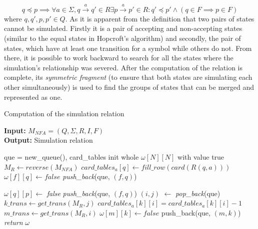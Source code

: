 \begin{equation*}
    q \preceq p \implies \forall a \in \Sigma , q\xrightarrow{\text{$a$}}q' \in R \exists p\xrightarrow{\text{$a$}}p' \in R: q' \preceq p' \land (q \in F \implies p \in F) 
\end{equation*}
where $q,q',p,p' \in Q$. As it is apparent from the definition that two pairs of states cannot be simulated. Firstly it is a pair of accepting and non-accepting states (similar to the equal states in Hopcroft’s algorithm) and secondly, the pair of states, which have at least one transition for a symbol while others do not. From there, it is possible to work backward to search for all the states where the simulation's relationship was severed. After the computation of the relation is complete, its \textit{symmetric fragment} (to ensure that both states are simulating each other simultaneously) is used to find the groups of states that can be merged and represented as one.

\begin{algorithm}
\caption{Computation of the simulation relation} \label{alg:simulation}
 \hspace*{\algorithmicindent} \textbf{Input: } $M_{NFA}=(Q,\Sigma,R,I,F)$\\
 \hspace*{\algorithmicindent} \textbf{Output:} Simulation relation
\begin{algorithmic}[1]
\LState que = new\_queue(), card\_tables
\LState init whole $\omega[N][N]$ with value true
\LState $M_R \gets reverse(M_{NFA})$
    \LState $card\_tables_{a}[q] \gets fill\_row(card(R(q,a)))$
\popindent\EndFor
{}
                \LState $\omega[f][q] \gets false$
                \LState \textit{push\_back}(que, $(f,q)$)
            \popindent\EndIf
        \popindent\EndFor
    \popindent\EndIf
    
            \LState $\omega[q][p] \gets$ \textit{false}
            \LState \textit{push\_back}(que, $(f,q)$)
        \popindent\EndIf
    \popindent\EndFor
\popindent\EndFor
{}
    \LState $(i,j)$ $\gets$ \textit{pop\_back}(que)
        \LState $k\_trans \gets get\_trans(M_{R}, j)$
            \LState $card\_tables_{a}[k][i] = card\_tables_{a}[k][i] - 1$
                \LState $m\_trans \gets get\_trans(M_{R}, i)$
                        \LState $\omega[m][k] \gets false$
                        \LState  push\_back(que, $(m,k)$)
                    \popindent\EndIf
                \popindent\EndFor
            \popindent\EndIf
        \popindent\EndFor
    \popindent\EndFor
\popindent\EndWhile
\LState \textit{return} $\omega$
\end{algorithmic}
\end{algorithm}

